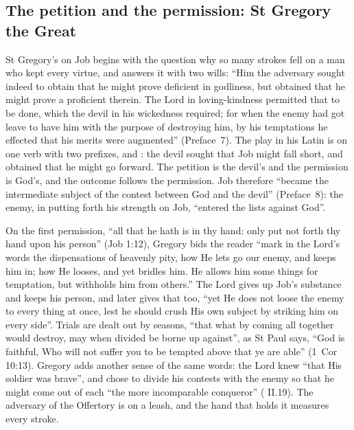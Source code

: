 \subsection{The petition and the permission: St Gregory the Great}

St Gregory's  on Job begins with the question why so many strokes
fell on a man who kept every virtue, and answers it with two wills: ``Him the
adversary sought indeed to obtain that he might prove deficient in godliness,
but obtained that he might prove a proficient therein. The Lord in
loving-kindness permitted that to be done, which the devil in his wickedness
required; for when the enemy had got leave to have him with the purpose of
destroying him, by his temptations he effected that his merits were augmented''
(Preface~7). The play in his Latin is on one verb with two prefixes,  and : the devil sought that Job might fall short,
and obtained that he might go forward. The petition is the devil's and the
permission is God's, and the outcome follows the permission. Job therefore
``became the intermediate subject of the contest between God and the devil''
(Preface~8): the enemy, in putting forth his strength on Job, ``entered the
lists against God''.

On the first permission, ``all that he hath is in thy hand: only put not forth
thy hand upon his person'' (Job 1:12), Gregory bids the reader ``mark in the
Lord's words the dispensations of heavenly pity, how He lets go our enemy, and
keeps him in; how He looses, and yet bridles him. He allows him some things for
temptation, but withholds him from others.'' The Lord gives up Job's substance
and keeps his person, and later gives that too, ``yet He does not loose the enemy
to every thing at once, lest he should crush His own subject by striking him on
every side''. Trials are dealt out by seasons, ``that what by coming all together
would destroy, may when divided be borne up against'', as St Paul says, ``God is
faithful, Who will not suffer you to be tempted above that ye are able'' (1~Cor
10:13). Gregory adds another sense of the same words: the Lord knew ``that His
soldier was brave'', and chose to divide his contests with the enemy so that he
might come out of each ``the more incomparable conqueror'' (
II.19). The adversary of the Offertory is on a leash, and the hand that holds it
measures every stroke.

